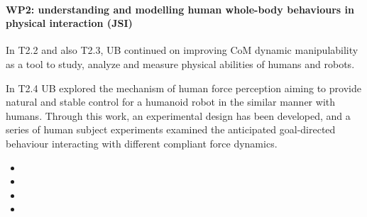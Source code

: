  
\paragraph*{WP2: understanding and modelling human whole-body behaviours in physical interaction (JSI)}

In T2.2 and also T2.3, UB continued on improving CoM dynamic manipulability as a tool to study, analyze and measure physical abilities of humans and robots.

In T2.4 UB explored the mechanism of human force perception aiming to provide natural and stable control for a humanoid robot in the similar manner with humans. Through this work, an experimental design has been developed, and a series of human subject experiments examined the anticipated goal-directed behaviour interacting with different compliant force dynamics.



\begin{itemize}

\item 
\item 
\item 
\item 

 \end{itemize}
